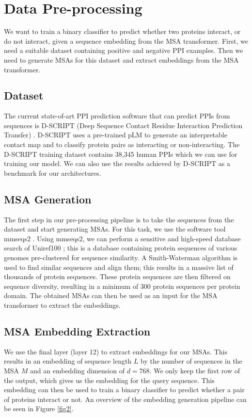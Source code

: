 \documentclass[11pt,a4paper]{article}
\begin{document}
\section{Data Pre-processing}
We want to train a binary classifier to predict whether two proteins interact, or do not interact, given a sequence embedding from the MSA transformer. First, we need a suitable dataset containing positive and negative PPI examples. Then we need to generate MSAs for this dataset and extract embeddings from the MSA transformer.

\subsection{Dataset}
The current state-of-art PPI prediction software that can predict PPIs from sequences is D-SCRIPT (Deep Sequence Contact Residue Interaction Prediction Transfer) \cite{sledzieski2021d}. D-SCRIPT uses a pre-trained pLM to generate an interpretable contact map and to classify protein pairs as interacting or non-interacting. The D-SCRIPT training dataset contains 38,345 human PPIs which we can use for training our model. We can also use the results achieved by D-SCRIPT as a benchmark for our architectures.

\subsection{MSA Generation}
The first step in our pre-processing pipeline is to take the sequences from the dataset and start generating MSAs. For this task, we use the software tool mmseqs2 \cite{steinegger2017mmseqs2}. Using mmseqs2, we can perform a sensitive and high-speed database search of Uniref100 \cite{suzek2015uniref}; this is a database containing protein sequences of various genomes pre-clustered for sequence similarity. A Smith-Waterman algorithm is used to find similar sequences and align them; this results in a massive list of thousands of protein sequences. These protein sequences are then filtered on sequence diversity, resulting in a minimum of 300 protein sequences per protein domain. The obtained MSAs can then be used as an input for the MSA transformer to extract the embeddings.

\subsection{MSA Embedding Extraction}
We use the final layer (layer 12) to extract embeddings for our MSAs. This results in an embedding of sequence length $L$ by the number of sequences in the MSA $M$ and an embedding dimension of $d = 768$. We only keep the first row of the output, which gives us the embedding for the query sequence. This embedding can then be used to train a binary classifier to predict whether a pair of proteins interact or not. An overview of the embedding generation pipeline can be seen in Figure \ref{fig2}.
\end{document}
